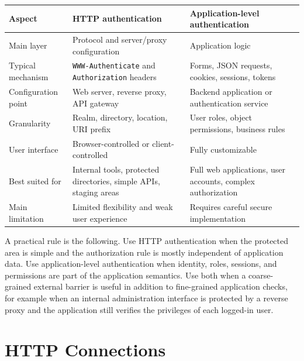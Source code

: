 \documentclass{scrbook}
\begin{document}
\begin{center}
	\begin{tabularx}{\linewidth}{p{}p{}X}
		\textbf{Aspect} & \textbf{HTTP authentication} & \textbf{Application-level authentication} \\
		\hline
		Main layer & Protocol and server/proxy configuration & Application logic \\ \hline
		
		Typical mechanism & \texttt{WWW-Authenticate} and \texttt{Authorization} headers & Forms, JSON requests, cookies, sessions, tokens \\ \hline
		
		Configuration point & Web server, reverse proxy, API gateway & Backend application or authentication service \\ \hline
		
		Granularity & Realm, directory, location, URI prefix & User roles, object permissions, business rules \\ \hline
		
		User interface & Browser-controlled or client-controlled & Fully customizable \\ \hline
		
		Best suited for & Internal tools, protected directories, simple APIs, staging areas & Full web applications, user accounts, complex authorization \\ \hline
		
		Main limitation & Limited flexibility and weak user experience & Requires careful secure implementation \\ \hline
	\end{tabularx}
\end{center}

A practical rule is the following. Use HTTP authentication when the protected area is simple and the authorization rule is mostly independent of application data. Use application-level authentication when identity, roles, sessions, and permissions are part of the application semantics. Use both when a coarse-grained external barrier is useful in addition to fine-grained application checks, for example when an internal administration interface is protected by a reverse proxy and the application still verifies the privileges of each logged-in user.

\section{HTTP Connections}
\end{document}
